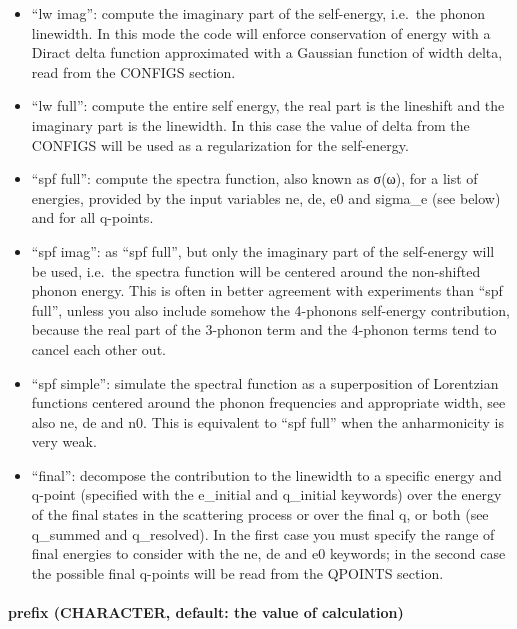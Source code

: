 \documentclass[
]{article}
\providecommand{\tightlist}{%
  \setlength{\itemsep}{0pt}\setlength{\parskip}{0pt}}
\begin{document}
\begin{itemize}
\tightlist
\item
  \enquote{lw imag}: compute the imaginary part of the self-energy,
  i.e.~the phonon linewidth. In this mode the code will enforce
  conservation of energy with a Diract delta function approximated with
  a Gaussian function of width delta, read from the CONFIGS section.
\item
  \enquote{lw full}: compute the entire self energy, the real part is
  the lineshift and the imaginary part is the linewidth. In this case
  the value of delta from the CONFIGS will be used as a regularization
  for the self-energy.
\item
  \enquote{spf full}: compute the spectra function, also known as σ(ω),
  for a list of energies, provided by the input variables ne, de, e0 and
  sigma\_e (see below) and for all q-points.
\item
  \enquote{spf imag}: as \enquote{spf full}, but only the imaginary part
  of the self-energy will be used, i.e.~the spectra function will be
  centered around the non-shifted phonon energy. This is often in better
  agreement with experiments than \enquote{spf full}, unless you also
  include somehow the 4-phonons self-energy contribution, because the
  real part of the 3-phonon term and the 4-phonon terms tend to cancel
  each other out.
\item
  \enquote{spf simple}: simulate the spectral function as a
  superposition of Lorentzian functions centered around the phonon
  frequencies and appropriate width, see also ne, de and n0. This is
  equivalent to \enquote{spf full} when the anharmonicity is very weak.
\item
  \enquote{final}: decompose the contribution to the linewidth to a
  specific energy and q-point (specified with the e\_initial and
  q\_initial keywords) over the energy of the final states in the
  scattering process or over the final q, or both (see q\_summed and
  q\_resolved). In the first case you must specify the range of final
  energies to consider with the ne, de and e0 keywords; in the second
  case the possible final q-points will be read from the QPOINTS
  section.
\end{itemize}

\hypertarget{prefix-character-default-the-value-of-calculation-2}{%
\paragraph{prefix (CHARACTER, default: the value of
calculation)}\label{prefix-character-default-the-value-of-calculation-2}}
\end{document}

